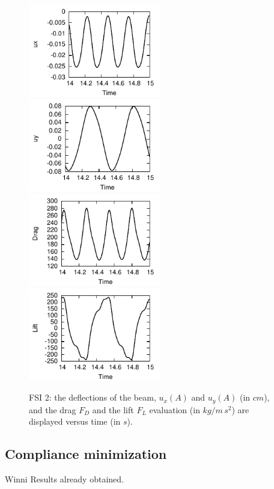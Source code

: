 \documentclass[prodmode,acmtoms]{acmsmall}
\numberwithin{equation}{section}
\begin{document}
\begin{figure}
\centering
{\includegraphics[width=5.8cm]{Pictures/ux_FSI_2_FS_t_3e-2_t_15e-3_global_2_Hron_grid.pdf}}
{\includegraphics[width=5.8cm]{Pictures/uy_FSI_2_FS_t_3e-2_t_15e-3_global_2_Hron_grid.pdf}}
{\includegraphics[width=5.8cm]{Pictures/Drag_fluid_FSI_2_FS_t_3e-2_t_15e-3_global_2_Hron_grid.pdf}}
{\includegraphics[width=5.8cm]{Pictures/Lift_fluid_FSI_2_FS_t_3e-2_t_15e-3_global_2_Hron_grid.pdf}}
\caption{FSI 2: the deflections of the beam, $u_x(A)$ and $u_y(A)$ (in $cm$), and 
the drag $F_D$ and the lift $F_L$ evaluation (in $kg/m\,s^2$) are displayed versus
time (in $s$).
} 
\label{res:results_ux_and_uy_fsi_2}
\end{figure}


\subsection{Compliance minimization}
Winni
Results already obtained.
\end{document}
